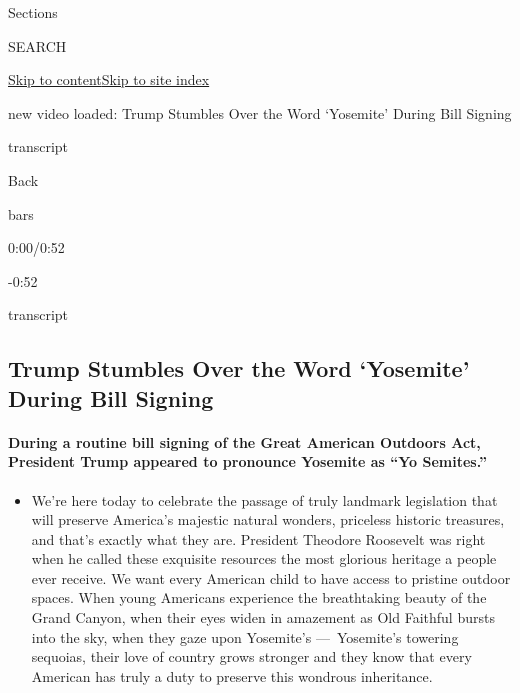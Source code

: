Sections

SEARCH

\protect\hyperlink{site-content}{Skip to
content}\protect\hyperlink{site-index}{Skip to site index}

new video loaded: Trump Stumbles Over the Word `Yosemite' During Bill
Signing

transcript

Back

bars

0:00/0:52

-0:52

transcript

\hypertarget{trump-stumbles-over-the-word-yosemite-during-bill-signing}{%
\subsection{Trump Stumbles Over the Word `Yosemite' During Bill
Signing}\label{trump-stumbles-over-the-word-yosemite-during-bill-signing}}

\hypertarget{during-a-routine-bill-signing-of-the-great-american-outdoors-act-president-trump-appeared-to-pronounce-yosemite-as-yo-semites}{%
\paragraph{During a routine bill signing of the Great American Outdoors
Act, President Trump appeared to pronounce Yosemite as ``Yo
Semites.''}\label{during-a-routine-bill-signing-of-the-great-american-outdoors-act-president-trump-appeared-to-pronounce-yosemite-as-yo-semites}}

\begin{itemize}
\tightlist
\item
  We're here today to celebrate the passage of truly landmark
  legislation that will preserve America's majestic natural wonders,
  priceless historic treasures, and that's exactly what they are.
  President Theodore Roosevelt was right when he called these exquisite
  resources the most glorious heritage a people ever receive. We want
  every American child to have access to pristine outdoor spaces. When
  young Americans experience the breathtaking beauty of the Grand
  Canyon, when their eyes widen in amazement as Old Faithful bursts into
  the sky, when they gaze upon Yosemite's ---~Yosemite's towering
  sequoias, their love of country grows stronger and they know that
  every American has truly a duty to preserve this wondrous inheritance.
\end{itemize}

